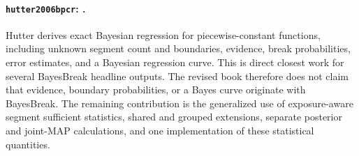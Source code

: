 
\paragraph{\texttt{hutter2006bpcr}: \citet{hutter2006bpcr}.}
Hutter derives exact Bayesian regression for piecewise-constant functions, including unknown segment count and boundaries, evidence, break probabilities, error estimates, and a Bayesian regression curve. This is direct closest work for several BayesBreak headline outputs. The revised book therefore does not claim that evidence, boundary probabilities, or a Bayes curve originate with BayesBreak. The remaining contribution is the generalized use of exposure-aware segment sufficient statistics, shared and grouped extensions, separate posterior and joint-MAP calculations, and one implementation of these statistical quantities.
